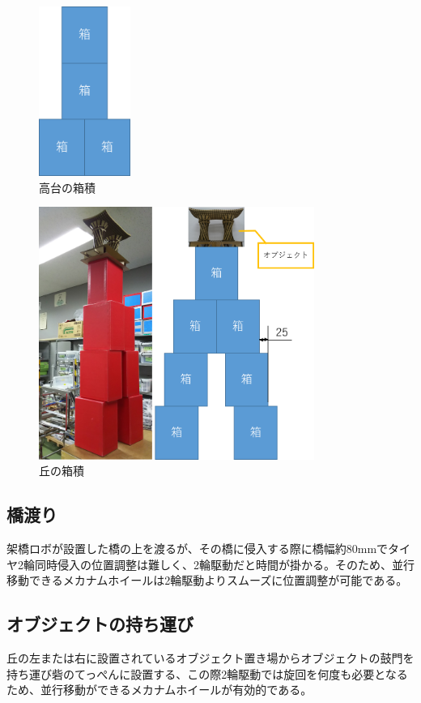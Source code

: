 \documentclass[12pt,oneside]{sotsuken_paper}
\begin{document}
		\begin{figure}[htp]
			\begin{center}
				\includegraphics[width=30mm]{Image/高台箱積.png}
				\caption{高台の箱積}
				\label{高台の箱積}
			\end{center}
		\end{figure}

		\begin{figure}[htp]
			\begin{center}
				\includegraphics[width=90mm]{Image/丘の箱積.png}
				\caption{丘の箱積}
				\label{丘の箱積}
			\end{center}
		\end{figure}

		\subsection{橋渡り}
		架橋ロボが設置した橋の上を渡るが、その橋に侵入する際に橋幅約80mmでタイヤ2輪同時侵入の位置調整は難しく、2輪駆動だと時間が掛かる。そのため、並行移動できるメカナムホイールは2輪駆動よりスムーズに位置調整が可能である。

		\subsection{オブジェクトの持ち運び}
		丘の左または右に設置されているオブジェクト置き場からオブジェクトの鼓門を持ち運び砦のてっぺんに設置する、この際2輪駆動では旋回を何度も必要となるため、並行移動ができるメカナムホイールが有効的である。
\end{document}
